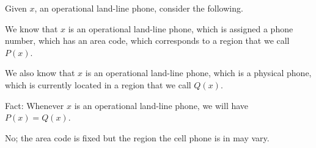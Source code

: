 Given $x$, an operational land-line phone, consider the following.

We know that $x$ is an operational land-line phone, which is assigned
a phone number, which has an area code, which corresponds to a region
that we call $P(x)$.

We also know that $x$ is an operational land-line phone, which is a
physical phone, which is currently located in a region that we call
$Q(x)$.

Fact: Whenever $x$ is an operational land-line phone, we will have
$P(x) = Q(x)$.


No; the area code is fixed but the region the cell phone is in may vary.


